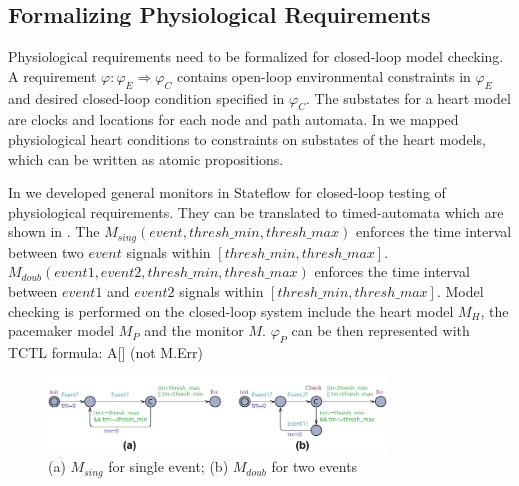 \subsection{Formalizing Physiological Requirements}
%
%
Physiological requirements need to be formalized for closed-loop model checking. A requirement $\varphi: \varphi_E\Rightarrow \varphi_C$ contains open-loop environmental constraints in $\varphi_E$ and desired closed-loop condition specified in $\varphi_C$.  The substates for a heart model are clocks and locations for each node and path automata. In \cite{iccps10} we mapped physiological heart conditions to constraints on substates of the heart models, which can be written as atomic propositions.

In \cite{iccps10} we developed general monitors in Stateflow for closed-loop testing of physiological requirements. They can be translated to timed-automata which are shown in . The $M_{sing}(event,thresh\_min, thresh\_max)$ enforces the time interval between two $event$ signals within $[thresh\_min,thresh\_max]$. \\
$M_{doub}(event1,event2,thresh\_min,thresh\_max)$ enforces the time interval between $event1$ and $event2$ signals within $[thresh\_min,thresh\_max]$. Model checking is performed on the closed-loop system include the heart model $M_H$, the pacemaker model $M_P$ and the monitor $M$. $\varphi_P$ can be then represented with TCTL formula:
 \textsf{A[] (not M.Err)}
\begin{figure}[!b]
		\centering
		\includegraphics[width=0.8\textwidth]{figs/monitor.pdf}
		\caption{\small (a) $M_{sing}$ for single event; (b) $M_{doub}$ for two events}
		\label{fig:monitor}
\end{figure}
%